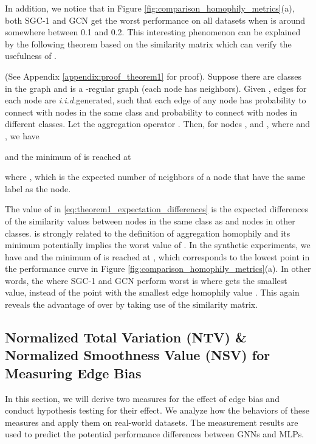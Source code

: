 \documentclass{article}
\newcommand\iid{\textit{i.i.d.}}
\newcommand{\0}{{\boldsymbol{0}}}
\newcommand{\6}{{\partial}}
\newcommand{\8}{{\infty}}
\newcommand{\4}{{\nabla}}
\newenvironment{theorem}[2][Theorem]{\begin{trivlist}
		\item[\hskip \labelsep {\bfseries #1}\hskip \labelsep {\bfseries #2.}]}{\end{trivlist}}
\newenvironment{corollary}[2][Corollary]{\begin{trivlist}
		\item[\hskip \labelsep {\bfseries #1}\hskip \labelsep {\bfseries #2.}]}{\end{trivlist}}
\begin{document}
In addition, we notice that in Figure \ref{fig:comparison_homophily_metrics}(a), both SGC-1 and GCN get the worst performance on all datasets when  is around somewhere between 0.1 and 0.2. This interesting phenomenon can be explained by the following theorem based on the similarity matrix which can verify the usefulness of .
\begin{theorem} 1
(See Appendix \ref{appendix:proof_theorem1} for proof). Suppose there are  classes in the graph  and  is a -regular graph (each node has  neighbors). Given , edges for each node are \iid generated, such that each edge of any node has probability  to connect with nodes in the same class and probability  to connect with nodes in different classes. Let the aggregation operator . Then, for nodes ,  and , where  and , we have

and the minimum of  is reached at 

where , which is the expected number of neighbors of a node that have the same label as the node.
\end{theorem}
\iffalse
\begin{corollary} 1
(See Appendix \ref{appendix:proof_corollary1} for proof).
Under the same assumptions as Theorem 1, suppose  and , then  and 

And if 

\end{corollary} 
\fi
The value of  in \eqref{eq:theorem1_expectation_differences} is the expected differences of the similarity values between nodes in the same class as  and nodes in other classes.  is strongly related to the definition of aggregation homophily and its minimum potentially implies the worst value of . In the synthetic experiments, we have  and the minimum of  is reached at , which corresponds to the lowest point in the performance curve in Figure \ref{fig:comparison_homophily_metrics}(a). In other words, the  where SGC-1 and GCN perform worst is where  gets the smallest value, instead of the point with the smallest edge homophily value . This again reveals the advantage of  over  by taking use of the similarity matrix.
\iffalse
\subsection{Normalized Total Variation (NTV) \& Normalized Smoothness Value (NSV) for Measuring Edge Bias}

\label{sec:NTV_NSV}
In this section, we will derive two measures for the effect of edge bias and conduct hypothesis testing for their effect. We analyze how the behaviors of these measures and apply them on  real-world datasets. The measurement results are used to predict the potential performance differences between GNNs and MLPs.
\end{document}
